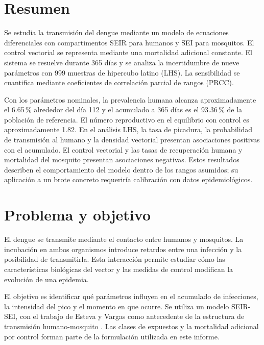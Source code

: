 \documentclass[12pt,spanish,oneside,openany]{MastersDoctoralThesis}
\author{\IntegranteUno; \IntegranteDos}
\numberwithin{equation}{section}
\begin{document}
\frontmatter
\pagestyle{plain}

\setcounter{page}{1}
\section*{Resumen}
Se estudia la transmisión del dengue mediante un modelo de ecuaciones diferenciales con compartimentos SEIR para humanos y SEI para mosquitos. El control vectorial se representa mediante una mortalidad adicional constante. El sistema se resuelve durante 365 días y se analiza la incertidumbre de nueve parámetros con 999 muestras de hipercubo latino (LHS). La sensibilidad se cuantifica mediante coeficientes de correlación parcial de rangos (PRCC).

Con los parámetros nominales, la prevalencia humana alcanza aproximadamente el 6.65\,\% alrededor del día 112 y el acumulado a 365 días es el 93.36\,\% de la población de referencia. El número reproductivo en el equilibrio con control es aproximadamente 1.82. En el análisis LHS, la tasa de picadura, la probabilidad de transmisión al humano y la densidad vectorial presentan asociaciones positivas con el acumulado. El control vectorial y las tasas de recuperación humana y mortalidad del mosquito presentan asociaciones negativas. Estos resultados describen el comportamiento del modelo dentro de los rangos asumidos; su aplicación a un brote concreto requeriría calibración con datos epidemiológicos.

\clearpage
\tableofcontents
\clearpage
\mainmatter
\pagestyle{thesis}

\section{Problema y objetivo}
El dengue se transmite mediante el contacto entre humanos y mosquitos. La incubación en ambos organismos introduce retardos entre una infección y la posibilidad de transmitirla. Esta interacción permite estudiar cómo las características biológicas del vector y las medidas de control modifican la evolución de una epidemia.

El objetivo es identificar qué parámetros influyen en el acumulado de infecciones, la intensidad del pico y el momento en que ocurre. Se utiliza un modelo SEIR-SEI, con el trabajo de Esteva y Vargas como antecedente de la estructura de transmisión humano-mosquito \cite{esteva}. Las clases de expuestos y la mortalidad adicional por control forman parte de la formulación utilizada en este informe.
\end{document}
